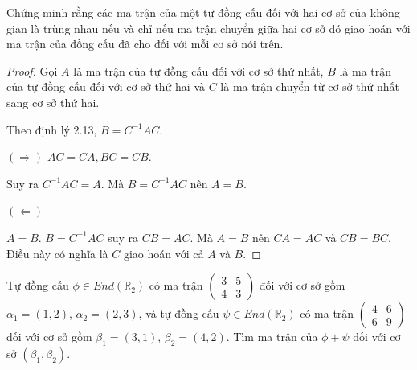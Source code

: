\begin{exercise}
    Chứng minh rằng các ma trận của một tự đồng cấu đối với hai cơ sở của không gian là trùng nhau nếu và chỉ nếu ma trận chuyển giữa hai cơ sở đó giao hoán với ma trận của đồng cấu đã cho đối với mỗi cơ sở nói trên.
\end{exercise}

\begin{proof}
    Gọi $A$ là ma trận của tự đồng cấu đối với cơ sở thứ nhất, $B$ là ma trận của tự đồng cấu đối với cơ sở thứ hai và $C$ là ma trận chuyển từ cơ sở thứ nhất sang cơ sở thứ hai.
    
    Theo định lý 2.13, $B = C^{-1}AC$.
    
    $(\Rightarrow)$ $AC = CA, BC = CB$.
    
    Suy ra $C^{-1}AC = A$. Mà $B = C^{-1}AC$ nên $A = B$.
    
    $(\Leftarrow)$
    
    $A = B$. $B = C^{-1}AC$ suy ra $CB = AC$. Mà $A = B$ nên $CA = AC$ và $CB = BC$. Điều này có nghĩa là $C$ giao hoán với cả $A$ và $B$.
\end{proof}

\begin{exercise}
    Tự đồng cấu $\phi\in End(\mathbb{R}_{2})$ có ma trận $\begin{pmatrix}3 & 5 \\ 4 & 3\end{pmatrix}$ đối với cơ sở gồm $\alpha_{1} = (1, 2)$, $\alpha_{2} = (2, 3)$, và tự đồng cấu $\psi\in End(\mathbb{R}_{2})$ có ma trận $\begin{pmatrix}4 & 6 \\ 6 & 9 \end{pmatrix}$ đối với cơ sở gồm $\beta_{1} = (3, 1)$, $\beta_{2} = (4, 2)$. Tìm ma trận của $\phi + \psi$ đối với cơ sở $(\beta_{1}, \beta_{2})$.
\end{exercise}

